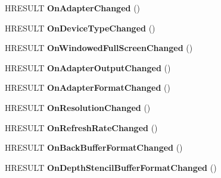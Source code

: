 \begin{DoxyCompactItemize}
\item 
\hypertarget{class_c_d3_d_settings_dlg_a16315666d38d33b8d6b6b896f854eb42}{H\+R\+E\+S\+U\+L\+T {\bfseries On\+Adapter\+Changed} ()}\label{class_c_d3_d_settings_dlg_a16315666d38d33b8d6b6b896f854eb42}

\item 
\hypertarget{class_c_d3_d_settings_dlg_a6e9145611a264f08597503e32a51aeea}{H\+R\+E\+S\+U\+L\+T {\bfseries On\+Device\+Type\+Changed} ()}\label{class_c_d3_d_settings_dlg_a6e9145611a264f08597503e32a51aeea}

\item 
\hypertarget{class_c_d3_d_settings_dlg_ae6c060173543d659cf6e4d810971c3ee}{H\+R\+E\+S\+U\+L\+T {\bfseries On\+Windowed\+Full\+Screen\+Changed} ()}\label{class_c_d3_d_settings_dlg_ae6c060173543d659cf6e4d810971c3ee}

\item 
\hypertarget{class_c_d3_d_settings_dlg_a2c808cf8781407a2c503955dcaeb3fe3}{H\+R\+E\+S\+U\+L\+T {\bfseries On\+Adapter\+Output\+Changed} ()}\label{class_c_d3_d_settings_dlg_a2c808cf8781407a2c503955dcaeb3fe3}

\item 
\hypertarget{class_c_d3_d_settings_dlg_a422dec4deed87610ff75783dceb2b4b8}{H\+R\+E\+S\+U\+L\+T {\bfseries On\+Adapter\+Format\+Changed} ()}\label{class_c_d3_d_settings_dlg_a422dec4deed87610ff75783dceb2b4b8}

\item 
\hypertarget{class_c_d3_d_settings_dlg_a37daa5c226dfa883b9bd9675f587188d}{H\+R\+E\+S\+U\+L\+T {\bfseries On\+Resolution\+Changed} ()}\label{class_c_d3_d_settings_dlg_a37daa5c226dfa883b9bd9675f587188d}

\item 
\hypertarget{class_c_d3_d_settings_dlg_a5f321948ac07b6c0707dfa65f9cbd990}{H\+R\+E\+S\+U\+L\+T {\bfseries On\+Refresh\+Rate\+Changed} ()}\label{class_c_d3_d_settings_dlg_a5f321948ac07b6c0707dfa65f9cbd990}

\item 
\hypertarget{class_c_d3_d_settings_dlg_a2ec3c8e1d0fb192aa5448c4ac8f138b2}{H\+R\+E\+S\+U\+L\+T {\bfseries On\+Back\+Buffer\+Format\+Changed} ()}\label{class_c_d3_d_settings_dlg_a2ec3c8e1d0fb192aa5448c4ac8f138b2}

\item 
\hypertarget{class_c_d3_d_settings_dlg_a7d589e810b5680c966665c94190b0170}{H\+R\+E\+S\+U\+L\+T {\bfseries On\+Depth\+Stencil\+Buffer\+Format\+Changed} ()}\label{class_c_d3_d_settings_dlg_a7d589e810b5680c966665c94190b0170}


\end{DoxyCompactItemize}
